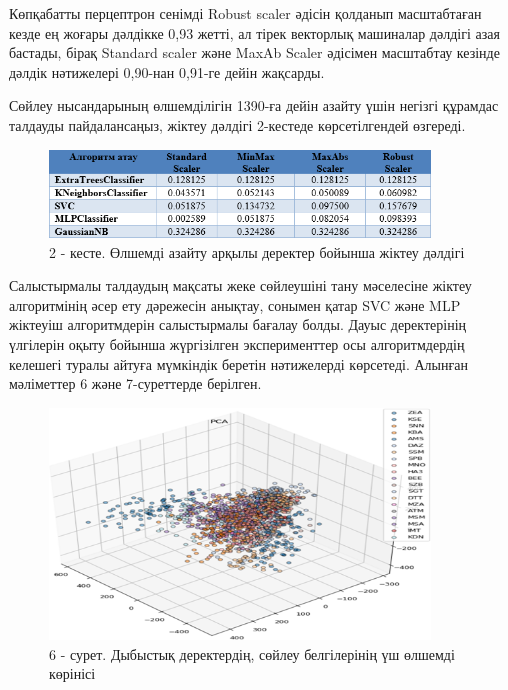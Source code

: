 \begin{multicols}{2}
Көпқабатты перцептрон сенімді Robust scaler әдісін қолданып масштабтаған
кезде ең жоғары дәлдікке 0,93 жетті, ал тірек векторлық машиналар
дәлдігі азая бастады, бірақ Standard scaler және MaxAb Scaler әдісімен
масштабтау кезінде дәлдік нәтижелері 0,90-нан 0,91-ге дейін жақсарды.

Сөйлеу нысандарының өлшемділігін 1390-ға дейін азайту үшін негізгі
құрамдас талдауды пайдалансаңыз, жіктеу дәлдігі 2-кестеде көрсетілгендей
өзгереді.
\end{multicols}

\begin{figure}[H]
	\centering
	\includegraphics[width=0.9\textwidth]{media/ict/image10}
	\caption*{2 - кесте. Өлшемді азайту арқылы деректер бойынша жіктеу дәлдігі}
\end{figure}

\begin{multicols}{2}
Салыстырмалы талдаудың мақсаты жеке сөйлеушіні тану мәселесіне жіктеу
алгоритмінің әсер ету дәрежесін анықтау, сонымен қатар SVC және MLP
жіктеуіш алгоритмдерін салыстырмалы бағалау болды. Дауыс деректерінің
үлгілерін оқыту бойынша жүргізілген эксперименттер осы алгоритмдердің
келешегі туралы айтуға мүмкіндік беретін нәтижелерді көрсетеді. Алынған
мәліметтер 6 және 7-суреттерде берілген.
\end{multicols}

\begin{figure}[H]
	\centering
	\includegraphics[width=0.9\textwidth]{media/ict/image11}
	\caption*{6 - сурет. Дыбыстық деректердің, сөйлеу белгілерінің үш өлшемді көрінісі}
\end{figure}


